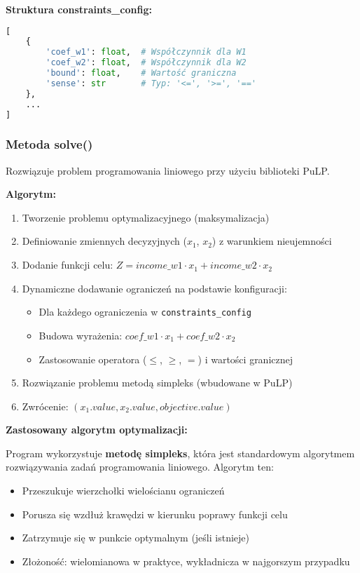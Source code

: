 \documentclass[12pt,a4paper]{article}
\begin{document}
\textbf{Struktura constraints\_config:}
\begin{lstlisting}[language=Python]
[
    {
        'coef_w1': float,  # Współczynnik dla W1
        'coef_w2': float,  # Współczynnik dla W2
        'bound': float,    # Wartość graniczna
        'sense': str       # Typ: '<=', '>=', '=='
    },
    ...
]
\end{lstlisting}

\subsubsection{Metoda solve()}

Rozwiązuje problem programowania liniowego przy użyciu biblioteki PuLP.

\textbf{Algorytm:}
\begin{enumerate}
    \item Tworzenie problemu optymalizacyjnego (maksymalizacja)
    \item Definiowanie zmiennych decyzyjnych ($x_1$, $x_2$) z warunkiem nieujemności
    \item Dodanie funkcji celu: $Z = income\_w1 \cdot x_1 + income\_w2 \cdot x_2$
    \item Dynamiczne dodawanie ograniczeń na podstawie konfiguracji:
    \begin{itemize}
        \item Dla każdego ograniczenia w \texttt{constraints\_config}
        \item Budowa wyrażenia: $coef\_w1 \cdot x_1 + coef\_w2 \cdot x_2$
        \item Zastosowanie operatora ($\leq$, $\geq$, $=$) i wartości granicznej
    \end{itemize}
    \item Rozwiązanie problemu metodą simpleks (wbudowane w PuLP)
    \item Zwrócenie: $(x_1.value, x_2.value, objective.value)$
\end{enumerate}

\textbf{Zastosowany algorytm optymalizacji:}

Program wykorzystuje \textbf{metodę simpleks}, która jest standardowym algorytmem rozwiązywania zadań programowania liniowego. Algorytm ten:
\begin{itemize}
    \item Przeszukuje wierzchołki wielościanu ograniczeń
    \item Porusza się wzdłuż krawędzi w kierunku poprawy funkcji celu
    \item Zatrzymuje się w punkcie optymalnym (jeśli istnieje)
    \item Złożoność: wielomianowa w praktyce, wykładnicza w najgorszym przypadku
\end{itemize}
\end{document}
